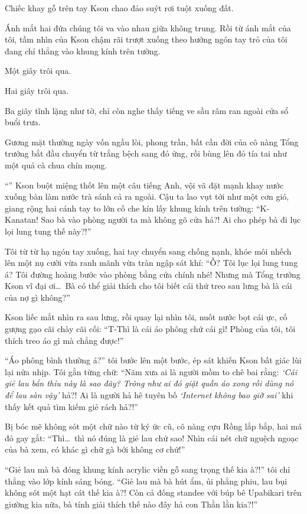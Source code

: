 \documentclass[../main.tex]{subfiles}
\begin{document}
Chiếc khay gỗ trên tay Kson chao đảo suýt rơi tuột xuống đất.

Ánh mắt hai đứa chúng tôi va vào nhau giữa không trung. Rồi từ ánh mắt của tôi, tầm nhìn của Kson chậm rãi trượt xuống theo hướng ngón tay trỏ của tôi đang chỉ thẳng vào khung kính trên tường.

Một giây trôi qua.

Hai giây trôi qua.

Ba giây tĩnh lặng như tờ, chỉ còn nghe thấy tiếng ve sầu râm ran ngoài cửa sổ buổi trưa.

Gương mặt thường ngày vốn ngầu lòi, phong trần, bất cần đời của cô nàng Tổng trưởng bắt đầu chuyển từ trắng bệch sang đỏ ửng, rồi bùng lên đỏ tía tai như một quả cà chua chín mọng.

``'' Kson buột miệng thốt lên một câu tiếng Anh, vội vã đặt mạnh khay nước xuống bàn làm nước trà sánh cả ra ngoài. Cậu ta lao vụt tới như một cơn gió, giang rộng hai cánh tay to lớn cố che kín lấy khung kính trên tường: ``K-Kanatan! Sao bà vào phòng người ta mà không gõ cửa hả?! Ai cho phép bà đi lục lọi lung tung thế này?!''

Tôi từ từ hạ ngón tay xuống, hai tay chuyển sang chống nạnh, khóe môi nhếch lên một nụ cười vừa ranh mãnh vừa tràn ngập sát khí: ``Ồ? Tôi lục lọi lung tung á? Tôi đường hoàng bước vào phòng bằng cửa chính nhé! Nhưng mà Tổng trưởng Kson vĩ đại ơi\dots\ Bà có thể giải thích cho tôi biết cái thứ treo sau lưng bà là cái của nợ gì không?''

Kson liếc mắt nhìn ra sau lưng, rồi quay lại nhìn tôi, nuốt nước bọt cái ực, cố gượng gạo cãi chày cãi cối: ``T-Thì là cái áo phông chứ cái gì! Phòng của tôi, tôi thích treo áo gì mà chẳng được!''

``Áo phông bình thường á?'' tôi bước lên một bước, ép sát khiến Kson bất giác lùi lại nửa nhịp. Tôi gằn từng chữ: ``Năm xưa ai là người mồm to chê bai rằng: \textit{`Cái giẻ lau bẩn thỉu này là sao đây? Trông như ai đó giặt quần áo xong rồi dùng nó để lau sàn vậy'} hả?! Ai là người hả hê tuyên bố \textit{`Internet không bao giờ sai'} khi thấy kết quả tìm kiếm giẻ rách hả?!''

Bị bóc mẽ không sót một chữ nào từ ký ức cũ, cô nàng cựu Rồng lắp bắp, hai má đỏ gay gắt: ``Thì\dots\ thì nó đúng là giẻ lau chứ sao! Nhìn cái nét chữ nguệch ngoạc của bà xem, có khác gì chữ gà bới không cơ chứ!''

``Giẻ lau mà bà đóng khung kính acrylic viền gỗ sang trọng thế kia à?!'' tôi chỉ thẳng vào lớp kính sáng bóng. ``Giẻ lau mà bà hút ẩm, ủi phẳng phiu, lau bụi không sót một hạt cát thế kia à?! Còn cả đống standee với búp bê Upabikari trên giường kia nữa, bà tính giải thích thế nào đây hả con Thằn lằn kia?!''
\end{document}
